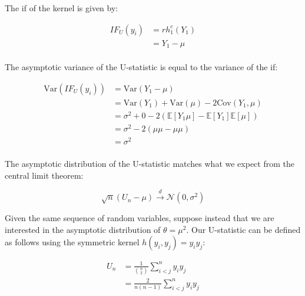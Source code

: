 \documentclass{report}
\begin{document}
The \gls{if} of the kernel is given by:

\begin{equation}\label{eq:ex-lst-u-statistic-mean-if}
    \begin{aligned}
      IF_U(y_i)
        &= rh_1^c(Y_1) \\
        &= Y_1 - \mu \\
    \end{aligned}
\end{equation}

The asymptotic variance of the U-statistic is equal to the variance of the \gls{if}:

\begin{equation}\label{eq:ex-lst-u-statistic-mean-if-variance}
    \begin{aligned}
      \text{Var}(IF_U(y_i))
        &= \text{Var}(Y_1 - \mu) \\
        &= \text{Var}(Y_1) + \text{Var}(\mu) - 2\text{Cov}(Y_1, \mu) \\
        &= \sigma^2 + 0 - 2(\mathbb{E}[Y_1\mu] - \mathbb{E}[Y_1]\mathbb{E}[\mu]) \\
        &= \sigma^2 - 2(\mu\mu - \mu\mu) \\
        &= \sigma^2 \\
    \end{aligned}
\end{equation}

The asymptotic distribution of the U-statistic matches what we expect from the central limit theorem:

\begin{equation}\label{eq:ex-lst-u-statistic-mean-asymptotics}
    \sqrt{n}(U_n - \mu) \overset{d}{\to} \mathcal{N}(0, \sigma^2)
\end{equation}

Given the same sequence of random variables, suppose instead that we are interested in the asymptotic distribution of $\theta = \mu^2$. Our U-statistic can be defined as follows using the symmetric kernel $h(y_i, y_j) = y_iy_j$:

\begin{equation}\label{eq:ex-lst-u-staistic-m2}
    \begin{aligned}
      U_n 
        &= \frac{1}{\binom{n}{2}} \sum_{i<j}^n y_iy_j \\
        &= \frac{2}{n(n-1)} \sum_{i<j}^n y_iy_j \\
    \end{aligned}
\end{equation}
\end{document}
